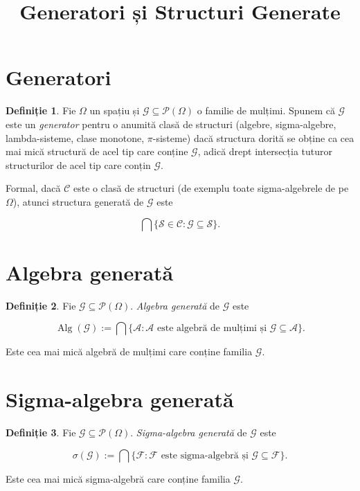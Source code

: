 \documentclass[12pt]{article}
\title{Generatori și Structuri Generate}
\author{}
\date{}
\theoremstyle{definition}
\newtheorem{definition}{Definiție}
\begin{document}
\maketitle

\section{Generatori}

\begin{definition}
Fie $\Omega$ un spațiu și $\mathcal{G} \subseteq \mathcal{P}(\Omega)$ o familie de mulțimi.
Spunem că $\mathcal{G}$ este un \emph{generator} pentru o anumită clasă de structuri (algebre, sigma-algebre, lambda-sisteme, clase monotone, $\pi$-sisteme) dacă structura dorită se obține ca cea mai mică structură de acel tip care conține $\mathcal{G}$, adică drept intersecția tuturor structurilor de acel tip care conțin $\mathcal{G}$.
\end{definition}

\noindent
Formal, dacă $\mathcal{C}$ este o clasă de structuri (de exemplu toate sigma-algebrele de pe $\Omega$), atunci structura generată de $\mathcal{G}$ este


\[
    \bigcap \{\mathcal{S} \in \mathcal{C} : \mathcal{G} \subseteq \mathcal{S}\}.
\]



\section{Algebra generată}

\begin{definition}
Fie $\mathcal{G} \subseteq \mathcal{P}(\Omega)$. \emph{Algebra generată} de $\mathcal{G}$ este


\[
    \operatorname{Alg}(\mathcal{G})
    :=
    \bigcap \{\mathcal{A} : \mathcal{A} \text{ este algebră de mulțimi și } \mathcal{G} \subseteq \mathcal{A}\}.
\]


Este cea mai mică algebră de mulțimi care conține familia $\mathcal{G}$.
\end{definition}

\section{Sigma-algebra generată}

\begin{definition}
Fie $\mathcal{G} \subseteq \mathcal{P}(\Omega)$. \emph{Sigma-algebra generată} de $\mathcal{G}$ este


\[
    \sigma(\mathcal{G})
    :=
    \bigcap \{\mathcal{F} : \mathcal{F} \text{ este sigma-algebră și } \mathcal{G} \subseteq \mathcal{F}\}.
\]


Este cea mai mică sigma-algebră care conține familia $\mathcal{G}$.
\end{definition}
\end{document}
